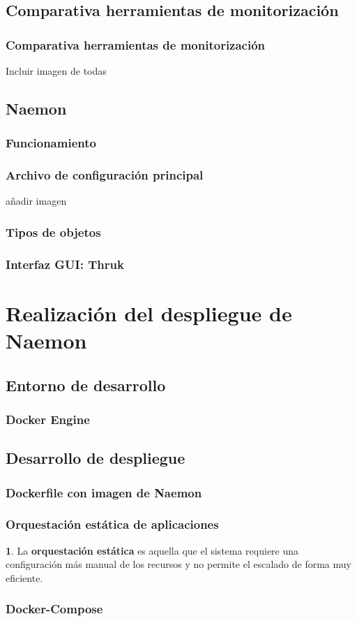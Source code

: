 \documentclass{beamer}
\theoremstyle{plain}
\theoremstyle{definition}
\newtheorem{defn}[thm]{}
\theoremstyle{plain}
\theoremstyle{definition}
\theoremstyle{remark}
\theoremstyle{definition}
\begin{document}
\subsection{Comparativa herramientas de monitorización}
\begin{frame}
	\frametitle{Comparativa herramientas de monitorización}
	Incluir imagen de todas	
\end{frame}

\subsection{Naemon}
\begin{frame}
	\frametitle{Funcionamiento}
	
\end{frame}
\begin{frame}
	\frametitle{Archivo de configuración principal}
	añadir imagen
		
\end{frame}

\begin{frame}
	\frametitle{Tipos de objetos}
	
	
	
\end{frame}

\begin{frame}
	\frametitle{Interfaz GUI: Thruk}
	
\end{frame}


\section{Realización del despliegue de Naemon} %


\subsection{Entorno de desarrollo}
\begin{frame}
	\frametitle{Docker Engine}
	
\end{frame}
\subsection{Desarrollo de despliegue}
\begin{frame}
	\frametitle{Dockerfile con imagen de Naemon}
	
\end{frame}
\begin{frame}
	\frametitle{Orquestación estática de aplicaciones}
	\begin{defn}
		La \textbf{orquestación estática} es aquella que el sistema requiere una configuración más
		manual de los recursos y no permite el escalado de forma muy eficiente.
	\end{defn}
\end{frame}
\begin{frame}
	\frametitle{Docker-Compose}
\end{frame}
\end{document}
